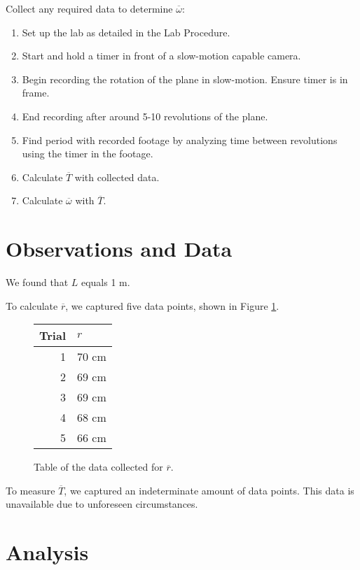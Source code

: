 \documentclass[12pt]{article}
\begin{document}
Collect any required data to determine $\overline{\omega}$:
\begin{enumerate}
    \item Set up the lab as detailed in the Lab Procedure.
    \item Start and hold a timer in front of a slow-motion capable camera.
    \item Begin recording the rotation of the plane in slow-motion. Ensure timer
        is in frame.
    \item End recording after around 5-10 revolutions of the plane.
    \item Find period with recorded footage by analyzing time between
        revolutions using the timer in the footage.
    \item Calculate $\overline{T}$ with collected data.
    \item Calculate $\overline{\omega}$ with $\overline{T}$.
\end{enumerate}

\section{Observations and Data}

We found that $L$ equals 1 m.

To calculate $\overline{r}$, we captured five data points, shown in Figure
\ref{fig:r_data}.

\begin{figure}[H]
    \centering
    \begin{tabular}{| r | l |}
        \hline
        Trial & $r$ \\ \hline
        1 & 70 cm \\
        2 & 69 cm \\
        3 & 69 cm \\
        4 & 68 cm \\
        5 & 66 cm \\
        \hline
    \end{tabular}
    \caption{Table of the data collected for $\overline{r}$.}
    \label{fig:r_data}
\end{figure}

To measure $\overline{T}$, we captured an indeterminate amount of data
points. This data is unavailable due to unforeseen circumstances.

\section{Analysis}
\end{document}
